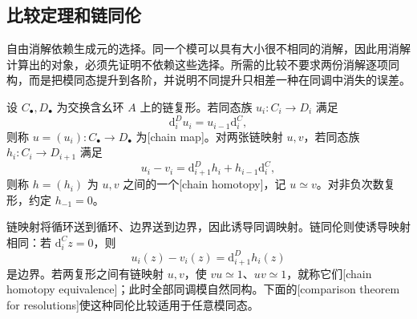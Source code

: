 \subsection{比较定理和链同伦}
\label{g5:subsec:0801:02}

自由消解依赖生成元的选择。同一个模可以具有大小很不相同的消解，因此用消解计算出的对象，必须先证明不依赖这些选择。所需的比较不要求两份消解逐项同构，而是把模同态提升到各阶，并说明不同提升只相差一种在同调中消失的误差。

\begin{definition}\label{g5:def:chain-homotopy}
	设 \(C_\bullet,D_\bullet\) 为交换含幺环 \(A\) 上的链复形。若同态族 \(u_i:C_i\to D_i\) 满足
	\[
		\mathrm{d}_i^D u_i=u_{i-1}\mathrm{d}_i^C,
	\]
	则称 \(u=(u_i):C_\bullet\to D_\bullet\) 为[chain map]。对两张链映射 \(u,v\)，若同态族 \(h_i:C_i\to D_{i+1}\) 满足
	\[
		u_i-v_i=\mathrm{d}_{i+1}^D h_i+h_{i-1}\mathrm{d}_i^C,
	\]
	则称 \(h=(h_i)\) 为 \(u,v\) 之间的一个[chain homotopy]，记 \(u\simeq v\)。对非负次数复形，约定 \(h_{-1}=0\)。
\end{definition}

链映射将循环送到循环、边界送到边界，因此诱导同调映射。链同伦则使诱导映射相同：若 \(\mathrm{d}_i^Cz=0\)，则
\[
	u_i(z)-v_i(z)=\mathrm{d}_{i+1}^Dh_i(z)
\]
是边界。若两复形之间有链映射 \(u,v\)，使 \(vu\simeq1\)、\(uv\simeq1\)，就称它们[chain homotopy equivalence]；此时全部同调模自然同构。下面的[comparison theorem for resolutions]使这种同伦比较适用于任意模同态。

